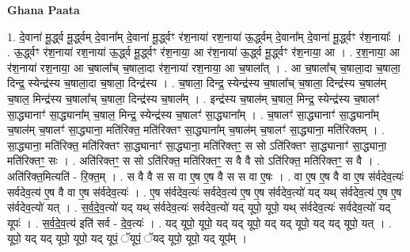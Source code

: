 \documentclass[17pt]{extarticle}
\begin{document}
\textbf{Ghana Paata } \newline

1. दे॒वाना॑ मू॒र्द्ध्व मू॒र्द्ध्वम् दे॒वाना᳚म् दे॒वाना॑ मू॒र्द्ध्वꣳ र॑श॒नाया॑ रश॒नाया॑ ऊ॒र्द्ध्वम् दे॒वाना᳚म् दे॒वाना॑ मू॒र्द्ध्वꣳ र॑श॒नायाः᳚ । . ऊ॒र्द्ध्वꣳ र॑श॒नाया॑ रश॒नाया॑ ऊ॒र्द्ध्व मू॒र्द्ध्वꣳ र॑श॒नाया॒ आ र॑श॒नाया॑ ऊ॒र्द्ध्व मू॒र्द्ध्वꣳ र॑श॒नाया॒ आ । . र॒श॒नाया॒ आ र॑श॒नाया॑ रश॒नाया॒ आ च॒षाला᳚च् च॒षाला॒दा र॑श॒नाया॑ रश॒नाया॒ आ च॒षाला᳚त् । . आ च॒षाला᳚च् च॒षाला॒दा च॒षाला॒ दिन्द्र॒ स्येन्द्र॑स्य च॒षाला॒दा च॒षाला॒ दिन्द्र॑स्य । . च॒षाला॒ दिन्द्र॒ स्येन्द्र॑स्य च॒षाला᳚च् च॒षाला॒ दिन्द्र॑स्य च॒षाल॑म् च॒षाल॒ मिन्द्र॑स्य च॒षाला᳚च् च॒षाला॒ दिन्द्र॑स्य च॒षाल᳚म् । . इन्द्र॑स्य च॒षाल॑म् च॒षाल॒ मिन्द्र॒ स्येन्द्र॑स्य च॒षालꣳ॑ सा॒द्ध्यानाꣳ॑ सा॒द्ध्याना᳚म् च॒षाल॒ मिन्द्र॒ स्येन्द्र॑स्य च॒षालꣳ॑ सा॒द्ध्याना᳚म् । . च॒षालꣳ॑ सा॒द्ध्यानाꣳ॑ सा॒द्ध्याना᳚म् च॒षाल॑म् च॒षालꣳ॑ सा॒द्ध्याना॒ मति॑रिक्त॒ मति॑रिक्तꣳ सा॒द्ध्याना᳚म् च॒षाल॑म् च॒षालꣳ॑ सा॒द्ध्याना॒ मति॑रिक्तम् । . सा॒द्ध्याना॒ मति॑रिक्त॒ मति॑रिक्तꣳ सा॒द्ध्यानाꣳ॑ सा॒द्ध्याना॒ मति॑रिक्तꣳ॒॒ स सो ऽति॑रिक्तꣳ सा॒द्ध्यानाꣳ॑ सा॒द्ध्याना॒ मति॑रिक्तꣳ॒॒ सः । . अति॑रिक्तꣳ॒॒ स सो ऽति॑रिक्त॒ मति॑रिक्तꣳ॒॒ स वै वै सो ऽति॑रिक्त॒ मति॑रिक्तꣳ॒॒ स वै । . अति॑रिक्त॒मित्यति॑ - रि॒क्त॒म् । . स वै वै स स वा ए॒ष ए॒ष वै स स वा ए॒षः । . वा ए॒ष ए॒ष वै वा ए॒ष स॑र्वदेव॒त्यः॑ सर्वदेव॒त्य॑ ए॒ष वै वा ए॒ष स॑र्वदेव॒त्यः॑ । . ए॒ष स॑र्वदेव॒त्यः॑ सर्वदेव॒त्य॑ ए॒ष ए॒ष स॑र्वदेव॒त्यो॑ यद् यथ् स॑र्वदेव॒त्य॑ ए॒ष ए॒ष स॑र्वदेव॒त्यो॑ यत् । . स॒र्व॒दे॒व॒त्यो॑ यद् यथ् स॑र्वदेव॒त्यः॑ सर्वदेव॒त्यो॑ यद् यूपो॒ यूपो॒ यथ् स॑र्वदेव॒त्यः॑ सर्वदेव॒त्यो॑ यद् यूपः॑ । . स॒र्व॒दे॒व॒त्य॑ इति॑ सर्व - दे॒व॒त्यः॑ । . यद् यूपो॒ यूपो॒ यद् यद् यूपो॒ यद् यद् यूपो॒ यद् यद् यूपो॒ यत् । . यूपो॒ यद् यद् यूपो॒ यूपो॒ यद् यूपं॒ ॅयूपं॒ ॅयद् यूपो॒ यूपो॒ यद् यूप᳚म् । \newline
\end{document}
